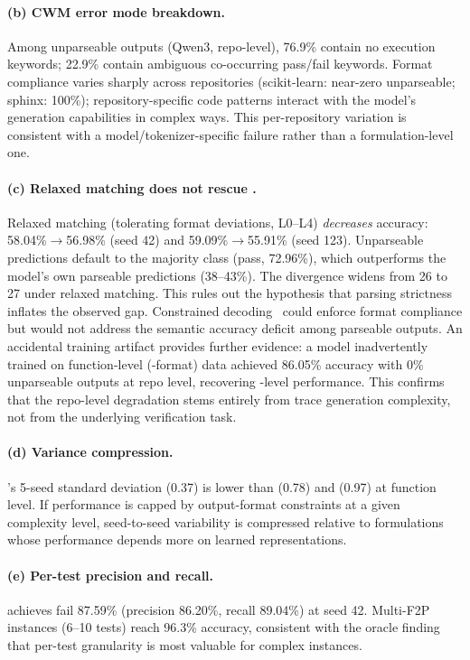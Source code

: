 \paragraph{(b) CWM error mode breakdown.}
Among unparseable \cwm{} outputs (Qwen3, repo-level), 76.9\% contain no execution keywords; 22.9\% contain ambiguous co-occurring pass/fail keywords. Format compliance varies sharply across repositories (scikit-learn: near-zero unparseable; sphinx: 100\%); repository-specific code patterns interact with the model's generation capabilities in complex ways. This per-repository variation is consistent with a model/tokenizer-specific failure rather than a formulation-level one.

\paragraph{(c) Relaxed matching does not rescue \cwm{}.}
Relaxed matching (tolerating format deviations, L0--L4) \emph{decreases} \cwm{} accuracy: 58.04\%$\to$56.98\% (seed 42) and 59.09\%$\to$55.91\% (seed 123). Unparseable predictions default to the majority class (pass, 72.96\%), which outperforms the model's own parseable predictions (38--43\%). The divergence widens from 26\pp{} to 27\pp{} under relaxed matching. This rules out the hypothesis that parsing strictness inflates the observed gap. Constrained decoding~\cite{willard2023outlines} could enforce format compliance but would not address the semantic accuracy deficit among parseable outputs. An accidental training artifact provides further evidence: a \cwm{} model inadvertently trained on function-level (\cls{}-format) data achieved 86.05\% accuracy with 0\% unparseable outputs at repo level, recovering \cls{}-level performance. This confirms that the repo-level \cwm{} degradation stems entirely from trace generation complexity, not from the underlying verification task.

\paragraph{(d) Variance compression.}
\cwm{}'s 5-seed standard deviation (0.37\pp{}) is lower than \cls{} (0.78\pp{}) and \traj{} (0.97\pp{}) at function level. If \cwm{} performance is capped by output-format constraints at a given complexity level, seed-to-seed variability is compressed relative to formulations whose performance depends more on learned representations.

\paragraph{(e) Per-test precision and recall.}
\cls{} achieves fail \fone{} 87.59\% (precision 86.20\%, recall 89.04\%) at seed 42.%
Multi-F2P instances (6--10 tests) reach 96.3\% accuracy, consistent with the oracle finding that per-test granularity is most valuable for complex instances.


